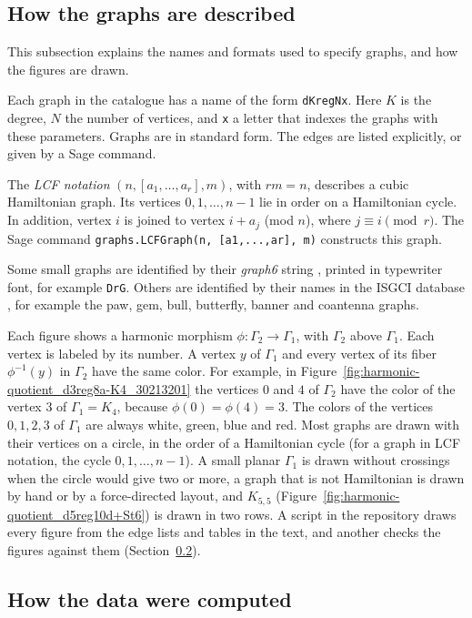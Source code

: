 \documentclass[12pt,letterpaper]{article}
\theoremstyle{definition}
\begin{document}
\subsection{How the graphs are described}
\label{sec:graph-data}

This subsection explains the names and formats used to specify graphs,
and how the figures are drawn.

Each graph in the catalogue has a name of the form {\tt dKregNx}. Here
$K$ is the degree, $N$ the number of vertices, and {\tt x} a letter that
indexes the graphs with these parameters. Graphs are in standard form. The
edges are listed explicitly, or given by a Sage command.

The {\it LCF notation} $(n,[a_1,\dots,a_r],m)$, with $rm=n$, describes a
cubic Hamiltonian graph. Its vertices $0,1,\dots,n-1$ lie in order on a
Hamiltonian cycle. In addition, vertex $i$ is joined to vertex $i+a_j$
(mod $n$), where $j\equiv i \pmod r$. The Sage command
{\tt graphs.LCFGraph(n, [a1,...,ar], m)} constructs this graph.

Some small graphs are identified by their {\it graph6} string \cite{Mc26},
printed in typewriter font, for example {\tt DrG}. Others are identified by
their names in the ISGCI database \cite{dR26}, for example the paw, gem,
bull, butterfly, banner and coantenna graphs.

Each figure shows a harmonic morphism $\phi:\Gamma_2\to\Gamma_1$, with
$\Gamma_2$ above $\Gamma_1$. Each vertex is labeled by its number. A vertex
$y$ of $\Gamma_1$ and every vertex of its fiber $\phi^{-1}(y)$ in $\Gamma_2$
have the same color. For example, in
Figure~\ref{fig:harmonic-quotient_d3reg8a-K4_30213201} the vertices $0$ and
$4$ of $\Gamma_2$ have the color of the vertex $3$ of $\Gamma_1=K_4$, because
$\phi(0)=\phi(4)=3$. The colors of the vertices $0,1,2,3$ of $\Gamma_1$ are
always white, green, blue and red. Most graphs are drawn with their
vertices on a circle, in the order of a Hamiltonian cycle (for a graph in
LCF notation, the cycle $0,1,\dots,n-1$). A small planar $\Gamma_1$ is
drawn without crossings when the circle would give two or more, a graph
that is not Hamiltonian is drawn by hand or by a force-directed layout, and
$K_{5,5}$ (Figure~\ref{fig:harmonic-quotient_d5reg10d+St6}) is drawn in two
rows. A script in the repository draws every figure from the edge lists
and tables in the text, and another checks the figures against them
(Section~\ref{sec:computations}).

\subsection{How the data were computed}
\label{sec:computations}
\end{document}
